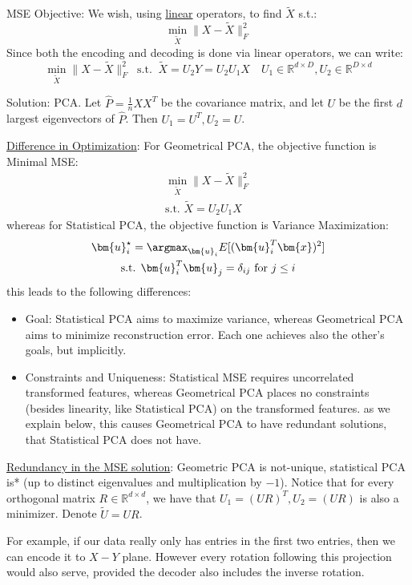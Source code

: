 \documentclass{article}
\begin{document}
MSE Objective: We wish, using \ul{linear} operators, to find $\widetilde{X}$ s.t.:
  \[
    \min_{\widetilde{X}} \lVert X - \widetilde{X} \rVert_{F}^2
  \]
Since both the encoding and decoding is done via linear operators, we can write:
\[
  \min_{\widetilde{X}} \lVert X - \widetilde{X} \rVert_{F}^2 \ \text{ s.t. } \ \widetilde{X} = U_{2}Y = U_{2} U_{1}X \quad  U_1 \in \mathbb{R}^{d \times  D}, U_2 \in \mathbb{R}^{D \times d}
\]

Solution: PCA. Let $\hat{P} = \frac{1}{n} X X^{T}$ be the covariance matrix, and let $U$ be the first $d$ largest eigenvectors of $\hat{P}$. Then $U_1 = U ^{T}, U_2 = U$.

\ul{Difference in Optimization}: For Geometrical PCA, the objective function is Minimal MSE:
\begin{gather*}
  \min_{\widetilde{X}} \lVert X - \widetilde{X} \rVert _F ^2 \\
  \text{s.t. } \widetilde{X} = U_{2}U_{1}X 
\end{gather*}
whereas for Statistical PCA, the objective function is Variance Maximization:
\begin{gather*}
  \bm{u}_{i} ^{\star} = \argmax_{\bm{u}_i} E[(\bm{u}_i ^{T} \bm{x})^2]   \\
  \text{s.t. } \bm{u}_i ^{T} \bm{u}_{j} = \delta_{ij} \text{ for } j \leq i
\end{gather*}
this leads to the following differences:
\begin{itemize}

  \item Goal: Statistical PCA aims to maximize variance, whereas Geometrical PCA aims to minimize reconstruction error. Each one achieves also the other's goals, but implicitly. 
  \item Constraints and Uniqueness: Statistical MSE requires uncorrelated transformed features, whereas Geometrical PCA places no constraints (besides linearity, like Statistical PCA) on the transformed features. as we explain below, this causes Geometrical PCA to have redundant solutions, that Statistical PCA does not have.
\end{itemize}

\ul{Redundancy in the MSE solution}: Geometric PCA is not-unique, statistical PCA is* (up to distinct eigenvalues and multiplication by $-1$).  Notice that for every orthogonal matrix $R \in \mathbb{R}^{d \times d}$, we have that $U_1 = (UR)^{T}, U_2 = (UR)$ is also a minimizer.  Denote $\widetilde{U}=UR$. 

For example, if our data really only has entries in the first two entries, then we can encode it to $X-Y$ plane. 
However every rotation following this projection would also serve, provided the decoder also includes the inverse rotation. 
\end{document}
